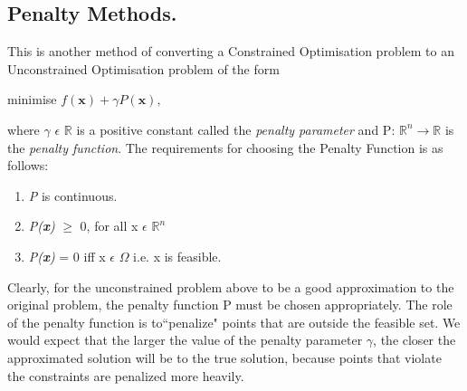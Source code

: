 \documentclass[12pt,a4paper,titlepage]{article}
\begin{document}
\subsection{Penalty Methods.}
This is another method of converting a Constrained Optimisation problem to an Unconstrained Optimisation problem of the form 
\begin{center}
    minimise $f(\boldsymbol{x})+\gamma P(\boldsymbol{x}),$
\end{center}
where $\gamma$ $\epsilon$ $\mathbb{R}$ is a positive constant called the \textit{penalty parameter} and P: $\mathbb{R}^{n} \rightarrow \mathbb{R}$ is the \textit{penalty function}. The requirements for choosing the Penalty Function is as follows:
\begin{enumerate}
    \item \textit{P} is continuous.
    \item \textit{P(\textbf{x})} $\geq$ 0, for all x $\epsilon$ $\mathbb{R}^{n}$
    \item \textit{P(\textbf{x})} = 0 iff x $\epsilon$ $\Omega$ i.e. x is feasible. 
\end{enumerate}
Clearly, for the unconstrained problem above to be a good approximation to the original problem, the penalty function P must be chosen appropriately. The role of the penalty function is to``penalize" points that are outside the feasible set.
We would expect that the larger the value of the penalty parameter $\gamma$, the closer the approximated solution will be to the true solution, because points that violate  the constraints are penalized more heavily.

%
%
\clearpage


\end{document}
